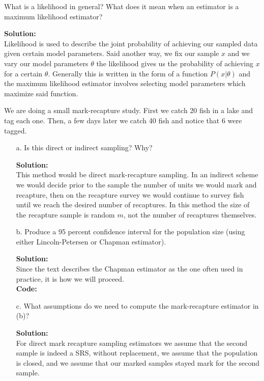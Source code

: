 \documentclass[12pt]{article}
\makeatletter
\theoremstyle{homework}
\newenvironment{exercise}[1]
{\def\@currentlabel{#1}\exercisecore}
{\endexercisecore}
\newcommand{\localhead}[1]{\par\smallskip\noindent\textbf{#1}\nobreak\\}%
\newcommand\solution{\localhead{Solution:}}
\makeatother
\begin{document}
\begin{exercise}{1} What is a likelihood in general? What does it mean when an estimator is a maximum likelihood estimator?\\
  \solution Likelihood is used to describe the joint probability of achieving our sampled data given certain model parameters. Said another way, 
  we fix our sample $x$ and we vary our model parameters $\theta$ the likelihood gives us the probability of achieving $x$ for a certain $\theta$. Generally this 
  is written in the form of a function $P(x|\theta)$ and the maximum likelihood estimator involves selecting model parameters which maximize said function. \\
\end{exercise}
\vspace{1in}

\begin{exercise}{2} We are doing a small mark-recapture study. First we catch 20 fish in a lake and tag each one. Then, a few days later we catch 40 fish and notice that 6 were tagged.\\
  \begin{enumerate}
    \item[a.]Is this direct or indirect sampling? Why?\\ 
    \solution This method would be direct mark-recapture sampling. In an indirect scheme we would decide prior to the sample the number of units we would mark and recapture, then on the recapture survey we 
    would continue to survey fish until we reach the desired number of recaptures. In this method the size of the recapture sample is random $m$, not the number of recaptures themselves. 
    \vspace{.15in}
    \item[b.] Produce a 95 percent confidence interval for the population size (using either Lincoln-Petersen or Chapman estimator).\\
    \solution Since the text describes the Chapman estimator as the one often used in practice, it is how we will proceed.\\  
      \textbf{Code:}  
      \begin{center}  
          
      \end{center}
    \vspace{.15in}

    \item[c.] What assumptions do we need to compute the mark-recapture estimator in (b)?\\
    \solution For direct mark recapture sampling estimators  we assume that the second sample is indeed a SRS, without replacement, we assume that the population is closed, and we assume that 
    our marked samples stayed mark for the second sample.
  \end{enumerate}
  
\end{exercise}
\vspace{1in}
\end{document}
